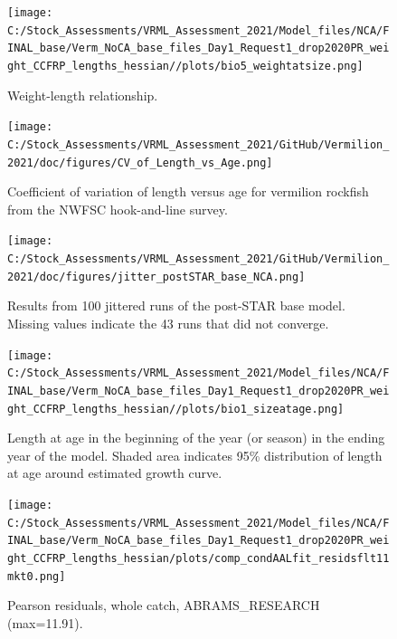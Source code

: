 \documentclass[11pt,
  english,
]{article}
\begin{document}
\FloatBarrier

\begin{figure}
\centering
\texttt{[image: C:/Stock\_Assessments/VRML\_Assessment\_2021/Model\_files/NCA/FINAL\_base/Verm\_NoCA\_base\_files\_Day1\_Request1\_drop2020PR\_weight\_CCFRP\_lengths\_hessian//plots/bio5\_weightatsize.png]}
\caption{Weight-length relationship.\label{fig:weightlength}}
\end{figure}

\FloatBarrier

\begin{figure}
\centering
\texttt{[image: C:/Stock\_Assessments/VRML\_Assessment\_2021/GitHub/Vermilion\_2021/doc/figures/CV\_of\_Length\_vs\_Age.png]}
\caption{Coefficient of variation of length versus age for vermilion rockfish from the NWFSC hook-and-line survey.\label{fig:cv-length-age}}
\end{figure}

\begin{figure}
\centering
\texttt{[image: C:/Stock\_Assessments/VRML\_Assessment\_2021/GitHub/Vermilion\_2021/doc/figures/jitter\_postSTAR\_base\_NCA.png]}
\caption{Results from 100 jittered runs of the post-STAR base model. Missing values indicate the 43 runs that did not converge.\label{fig:jitter}}
\end{figure}

\begin{figure}
\centering
\texttt{[image: C:/Stock\_Assessments/VRML\_Assessment\_2021/Model\_files/NCA/FINAL\_base/Verm\_NoCA\_base\_files\_Day1\_Request1\_drop2020PR\_weight\_CCFRP\_lengths\_hessian//plots/bio1\_sizeatage.png]}
\caption{Length at age in the beginning of the year (or season) in the ending year of the model. Shaded area indicates 95\% distribution of length at age around estimated growth curve.\label{fig:fittedgrowth}}
\end{figure}

\FloatBarrier

\FloatBarrier

\begin{figure}
\centering
\texttt{[image: C:/Stock\_Assessments/VRML\_Assessment\_2021/Model\_files/NCA/FINAL\_base/Verm\_NoCA\_base\_files\_Day1\_Request1\_drop2020PR\_weight\_CCFRP\_lengths\_hessian/plots/comp\_condAALfit\_residsflt11mkt0.png]}
\caption{Pearson residuals, whole catch, ABRAMS\_RESEARCH (max=11.91).\label{fig:comp_condAALfit_residsflt11mkt0}}
\end{figure}
\end{document}
